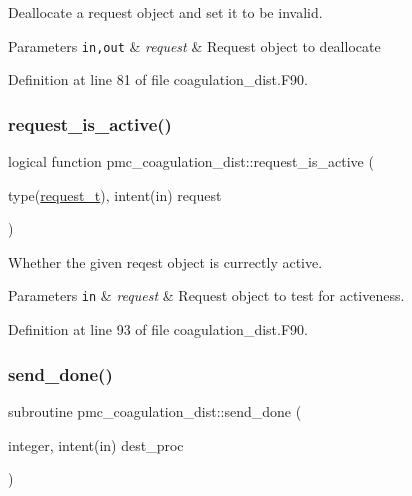 Deallocate a request object and set it to be invalid. 


\begin{DoxyParams}[1]{Parameters}
\mbox{\tt in,out}  & {\em request} & Request object to deallocate \\
\hline
\end{DoxyParams}


Definition at line 81 of file coagulation\+\_\+dist.\+F90.

\mbox{\label{namespacepmc__coagulation__dist_a2177c5bb512ea9262020b6928f2b5cba}} 
\subsubsection{\texorpdfstring{request\+\_\+is\+\_\+active()}{request\_is\_active()}}
{\footnotesize\ttfamily logical function pmc\+\_\+coagulation\+\_\+dist\+::request\+\_\+is\+\_\+active (\begin{DoxyParamCaption}\item[{type(\mbox{\hyperlink{structpmc__coagulation__dist_1_1request__t}{request\+\_\+t}}), intent(in)}]{request }\end{DoxyParamCaption})}



Whether the given reqest object is currectly active. 


\begin{DoxyParams}[1]{Parameters}
\mbox{\tt in}  & {\em request} & Request object to test for activeness. \\
\hline
\end{DoxyParams}


Definition at line 93 of file coagulation\+\_\+dist.\+F90.

\mbox{\label{namespacepmc__coagulation__dist_a1e9943ac016e1a33aea378a2c03475c2}} 
\subsubsection{\texorpdfstring{send\+\_\+done()}{send\_done()}}
{\footnotesize\ttfamily subroutine pmc\+\_\+coagulation\+\_\+dist\+::send\+\_\+done (\begin{DoxyParamCaption}\item[{integer, intent(in)}]{dest\+\_\+proc }\end{DoxyParamCaption})}



